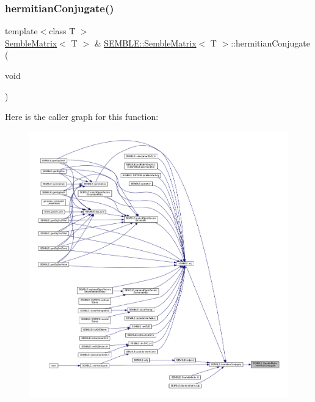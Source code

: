 \subsubsection{\texorpdfstring{hermitianConjugate()}{hermitianConjugate()}\hspace{0.1cm}{\footnotesize\ttfamily [1/2]}}
{\footnotesize\ttfamily template$<$class T $>$ \\
\mbox{\hyperlink{structSEMBLE_1_1SembleMatrix}{Semble\+Matrix}}$<$ T $>$ \& \mbox{\hyperlink{structSEMBLE_1_1SembleMatrix}{S\+E\+M\+B\+L\+E\+::\+Semble\+Matrix}}$<$ T $>$\+::hermitian\+Conjugate (\begin{DoxyParamCaption}\item[{void}]{ }\end{DoxyParamCaption})}

Here is the caller graph for this function\+:
\nopagebreak
\begin{figure}[H]
\begin{center}
\leavevmode
\includegraphics[width=350pt]{df/d87/structSEMBLE_1_1SembleMatrix_a2d9ca142e670502eb4f05c559dc33f1d_icgraph}
\end{center}
\end{figure}
\mbox{\label{structSEMBLE_1_1SembleMatrix_a13321a2e52ce610fd220853564a9cb3c}} 
